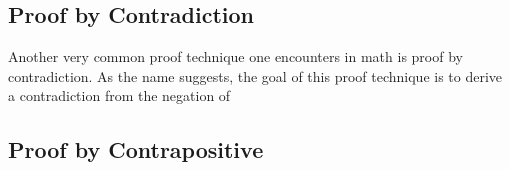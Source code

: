 \subsection{Proof by Contradiction}
Another very common proof technique one encounters in math is proof by contradiction.
As the name suggests, the goal of this proof technique is to derive a contradiction from the negation of
\subsection{Proof by Contrapositive}












